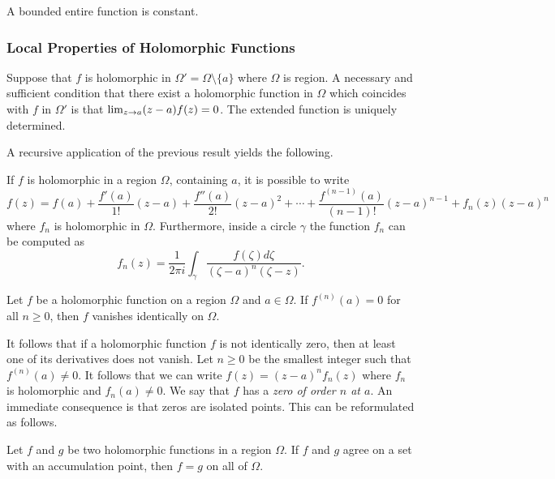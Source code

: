 \begin{theorem}
  A bounded entire function is constant.
\end{theorem}

\subsubsection{Local Properties of Holomorphic Functions}

\begin{theorem}
  Suppose that $f$ is holomorphic in $\Omega' = \Omega \setminus \{a\}$ where $\Omega$ is region. A necessary and sufficient condition that there exist a holomorphic function in $\Omega$ which coincides with $f$ in $\Omega'$ is that $\lim_{z \rightarrow a} (z-a)f(z) = 0$. The extended function is uniquely determined.
\end{theorem}

A recursive application of the previous result yields the following.

\begin{theorem}
  If $f$ is holomorphic in a region $\Omega$, containing $a$, it is possible to write
  \[
  f(z) = f(a) + \frac{f'(a)}{1!}(z-a) + \frac{f''(a)}{2!}(z-a)^2 + \cdots + \frac{f^{(n-1)}(a)}{(n-1)!}(z-a)^{n-1} + f_n(z) (z-a)^n
  \]
  where $f_n$ is holomorphic in $\Omega$. Furthermore, inside a circle $\gamma$ the function $f_n$ can be computed as
  \[
  f_n(z) = \frac{1}{2 \pi i} \int_\gamma \frac{f(\zeta) d \zeta}{(\zeta-a)^n(\zeta-z)}.
  \]
\end{theorem}

\begin{proposition}
  Let $f$ be a holomorphic function on a region $\Omega$ and $a \in \Omega$. If $f^{(n)}(a) = 0$ for all $n \geq 0$, then $f$ vanishes identically on $\Omega$.
\end{proposition}

It follows that if a holomorphic function $f$ is not identically zero, then at least one of its derivatives does not vanish. Let $n \geq 0$ be the smallest integer such that $f^{(n)}(a) \neq 0$. It follows that we can write $f(z) = (z-a)^n f_n(z)$ where $f_n$ is holomorphic and $f_n(a) \neq 0$. We say that $f$ has a \emph{zero of order $n$ at $a$}. An immediate consequence is that zeros are isolated points. This can be reformulated as follows.

\begin{proposition}
  Let $f$ and $g$ be two holomorphic functions in a region $\Omega$. If $f$ and $g$ agree on a set with an accumulation point, then $f = g$ on all of $\Omega$.
\end{proposition}

